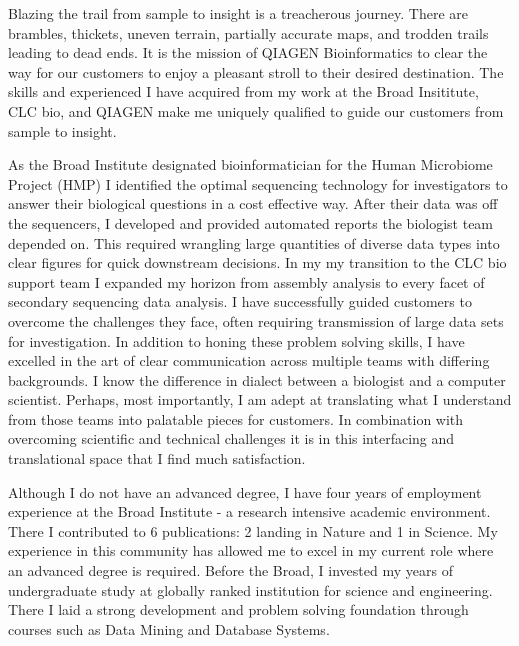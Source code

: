 \documentclass[10pt,letterpaper,sigleft]{newlfm}
\begin{document}
\begin{newlfm}


Blazing the trail from sample to insight is a treacherous journey. There are brambles, thickets, uneven terrain, partially accurate maps, and trodden trails leading to dead ends. It is the mission of QIAGEN Bioinformatics to clear the way for our customers to enjoy a pleasant stroll to their desired destination. The skills and experienced I have acquired from my work at the Broad Insititute, CLC bio, and QIAGEN make me uniquely qualified to guide our customers from sample to insight.

As the Broad Institute designated bioinformatician for the Human Microbiome Project (HMP) I identified the optimal sequencing technology for investigators to answer their biological questions in a cost effective way.  After their data was off the sequencers, I developed and provided automated reports the biologist team depended on. This required wrangling large quantities of diverse data types into clear figures for quick downstream decisions. In my my transition to the CLC bio support team I expanded my horizon from assembly analysis to every facet of secondary sequencing data analysis. I have successfully guided customers to overcome the challenges they face, often requiring transmission of large data sets for investigation. In addition to honing these problem solving skills, I have excelled in the art of clear communication across multiple teams with differing backgrounds. I know the difference in dialect between a biologist and a computer scientist. Perhaps, most importantly, I am adept at translating what I understand from those teams into palatable pieces for customers. In combination with overcoming scientific and technical challenges it is in this interfacing and translational space that I find much satisfaction. 

Although I do not have an advanced degree, I have four years of employment experience at the Broad Institute - a research intensive academic environment. There I contributed to 6 publications:  2 landing in Nature and 1 in Science. My experience in this community has allowed me to excel in my current role where an advanced degree is required. Before the Broad, I invested my years of undergraduate study at globally ranked institution for science and engineering. There I laid a strong development and problem solving foundation through courses such as Data Mining and Database Systems.


\end{newlfm}
\end{document}
